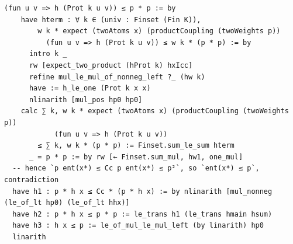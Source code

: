 \documentclass[11pt,a4paper]{article}
\theoremstyle{definition}
\theoremstyle{remark}
\begin{document}
\begin{Verbatim}[fontsize=\scriptsize,formatcom=\leanmono,samepage=false]
      (fun u v => h (Prot k u v)) ≤ p * p := by
    have hterm : ∀ k ∈ (univ : Finset (Fin K)),
        w k * expect (twoAtoms x) (productCoupling (twoWeights p))
          (fun u v => h (Prot k u v)) ≤ w k * (p * p) := by
      intro k _
      rw [expect_two_product (hProt k) hxIcc]
      refine mul_le_mul_of_nonneg_left ?_ (hw k)
      have := h_le_one (Prot k x x)
      nlinarith [mul_pos hp0 hp0]
    calc ∑ k, w k * expect (twoAtoms x) (productCoupling (twoWeights p))
            (fun u v => h (Prot k u v))
        ≤ ∑ k, w k * (p * p) := Finset.sum_le_sum hterm
      _ = p * p := by rw [← Finset.sum_mul, hw1, one_mul]
  -- hence `p ent(x*) ≤ Cc p ent(x*) ≤ p²`, so `ent(x*) ≤ p`, contradiction
  have h1 : p * h x ≤ Cc * (p * h x) := by nlinarith [mul_nonneg (le_of_lt hp0) (le_of_lt hhx)]
  have h2 : p * h x ≤ p * p := le_trans h1 (le_trans hmain hsum)
  have h3 : h x ≤ p := le_of_mul_le_mul_left (by linarith) hp0
  linarith
\end{Verbatim}
\end{document}
